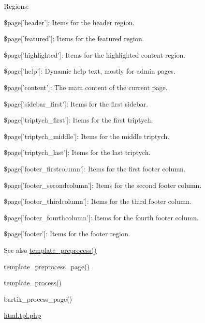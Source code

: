 Regions:
\begin{DoxyItemize}
\item \$page\mbox{[}'header'\mbox{]}: Items for the header region.
\item \$page\mbox{[}'featured'\mbox{]}: Items for the featured region.
\item \$page\mbox{[}'highlighted'\mbox{]}: Items for the highlighted content region.
\item \$page\mbox{[}'help'\mbox{]}: Dynamic help text, mostly for admin pages.
\item \$page\mbox{[}'content'\mbox{]}: The main content of the current page.
\item \$page\mbox{[}'sidebar\_\-first'\mbox{]}: Items for the first sidebar.
\item \$page\mbox{[}'triptych\_\-first'\mbox{]}: Items for the first triptych.
\item \$page\mbox{[}'triptych\_\-middle'\mbox{]}: Items for the middle triptych.
\item \$page\mbox{[}'triptych\_\-last'\mbox{]}: Items for the last triptych.
\item \$page\mbox{[}'footer\_\-firstcolumn'\mbox{]}: Items for the first footer column.
\item \$page\mbox{[}'footer\_\-secondcolumn'\mbox{]}: Items for the second footer column.
\item \$page\mbox{[}'footer\_\-thirdcolumn'\mbox{]}: Items for the third footer column.
\item \$page\mbox{[}'footer\_\-fourthcolumn'\mbox{]}: Items for the fourth footer column.
\item \$page\mbox{[}'footer'\mbox{]}: Items for the footer region.
\end{DoxyItemize}

\begin{DoxySeeAlso}{See also}
\hyperlink{includes_2theme_8inc_a3eeb7bcdba7ef4859f99586da264d347}{template\_\-preprocess()} 

\hyperlink{includes_2theme_8inc_a128dae24f990d8ba4710ac78b0584c11}{template\_\-preprocess\_\-page()} 

\hyperlink{includes_2theme_8inc_a9b4d56c55dab2c59b7af6f71d6b1a940}{template\_\-process()} 

bartik\_\-process\_\-page() 

\hyperlink{html_8tpl_8php}{html.tpl.php} 
\end{DoxySeeAlso}
